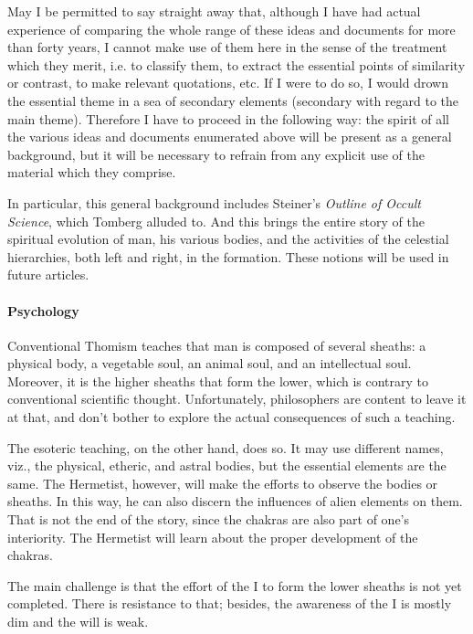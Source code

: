 \begin{quotationx}
May I be permitted to say straight away that, although I have had actual experience of comparing the whole range of
these ideas and documents for more than forty years, I cannot make use of them here in the sense of the treatment which
they merit, i.e. to classify them, to extract the essential points of similarity or contrast, to make relevant
quotations, etc. If I were to do so, I would drown the essential theme in a sea of secondary elements (secondary with
regard to the main theme). Therefore I have to proceed in the following way: the spirit of all the various ideas and
documents enumerated above will be present as a general background, but it will be necessary to refrain from any
explicit use of the material which they comprise. 

\end{quotationx}
In particular, this general background includes Steiner's \emph{Outline of Occult Science}, which Tomberg
alluded to. And this brings the entire story of the spiritual evolution of man, his various bodies, and the activities
of the celestial hierarchies, both left and right, in the formation. These notions will be used in future articles.

\paragraph{Psychology}
Conventional Thomism teaches that man is composed of several sheaths: a physical body, a vegetable soul, an animal soul,
and an intellectual soul. Moreover, it is the higher sheaths that form the lower, which is contrary to conventional
scientific thought. Unfortunately, philosophers are content to leave it at that, and don't bother to
explore the actual consequences of such a teaching.

The esoteric teaching, on the other hand, does so. It may use different names, viz., the physical, etheric, and astral
bodies, but the essential elements are the same. The Hermetist, however, will make the efforts to observe the bodies or
sheaths. In this way, he can also discern the influences of alien elements on them. That is not the end of the story,
since the chakras are also part of one's interiority. The Hermetist will learn about the proper development
of the chakras.

The main challenge is that the effort of the I to form the lower sheaths is not yet completed. There is resistance to
that; besides, the awareness of the I is mostly dim and the will is weak.

